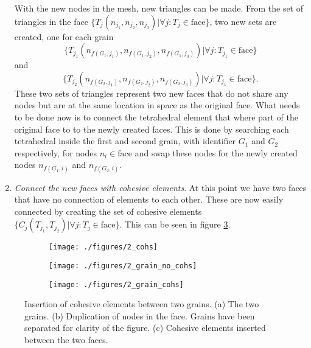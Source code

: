 \documentclass[grain_boundary_law.tex]{subfiles}
\begin{document}
\begin{enumerate}
With the new nodes in the mesh, new triangles can be made. From the set of triangles in the face $\{ T_j(n_{j_1}, n_{j_2}, n_{j_3}) | \forall j: T_j \in \text{face} \}$, two new sets are created, one for each grain 
\[ \{ T_{j_1}(n_{f(G_1,j_1)}, n_{f(G_1,j_2)}, n_{f(G_1,j_3)}) | \forall j: {T_{j_1} \in \text{face} \}} \]
 and 
\[ \{ T_{j_2}(n_{f(G_2,j_1)}, n_{f(G_2,j_2)}, n_{f(G_2,j_3)}) | \forall j: {T_{j_1} \in \text{face} \}}.\]  
 These two sets of triangles represent two new faces that do not share any nodes but are at the same location in space as the original face. What needs to be done now is to connect the tetrahedral element that where part of the original face to to the newly created faces. This is done by searching each tetrahedral inside the first and second grain, with identifier $G_1$ and $G_2$ respectively, for nodes $n_i \in \text{face}$ and swap these nodes for the newly created nodes  $n_{f(G_1, i)}$ and $n_{f(G_2, i)}$.

\item \textit{Connect the new faces with cohesive elements}. At this point we have two faces that have no connection of elements to each other. These are now easily connected by creating the set of cohesive elements $ \{ C_j(T_{j_1},T_{j_2}) |  \forall j: T_j \in \text{face}  \} $. This can be seen in figure \ref{fig:cohs_2_c}. 
\end{enumerate}


\begin{figure}
\centering
\begin{subfigure}[b]{.5\linewidth}
  \centering
  \texttt{[image: ./figures/2\_cohs]}
  \caption{}
  \label{fig:cohs_2_a}
\end{subfigure}%
\hspace{-10mm}
\begin{subfigure}[b]{.5\linewidth}
  \centering
  \texttt{[image: ./figures/2\_grain\_no\_cohs]}
  \caption{}
  \label{fig:cohs_2_b}
\end{subfigure}%
\hspace{-10mm}
\begin{subfigure}[b]{.5\linewidth}
  \centering
  \texttt{[image: ./figures/2\_grain\_cohs]}
  \caption{}
  \label{fig:cohs_2_c}
\end{subfigure}
\caption{Insertion of cohesive elements between two grains. (a) The two grains. (b) Duplication of nodes in the face. Grains have been separated for clarity of the figure. (c) Cohesive elements inserted between the two faces. }
\label{fig:cohs_2}
\end{figure}
\end{document}
